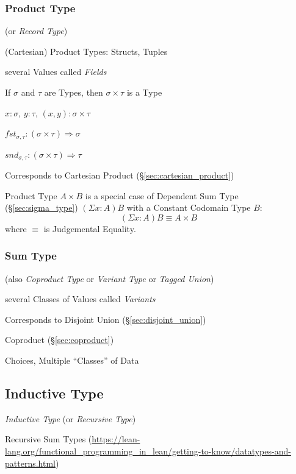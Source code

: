 \subsubsection{Product Type}\label{sec:product_type}

(or \emph{Record Type})

(Cartesian) Product Types: Structs, Tuples

several Values called \emph{Fields}

If $\sigma$ and $\tau$ are Types, then $\sigma \times \tau$ is a Type

$x : \sigma$, $y : \tau$, $(x,y) : \sigma \times \tau$

$fst_{\sigma,\tau} : (\sigma \times \tau) \Rightarrow \sigma$

$snd_{\sigma,\tau} : (\sigma \times \tau) \Rightarrow \tau$

Corresponds to Cartesian Product (\S\ref{sec:cartesian_product})

Product Type $A \times B$ is a special case of Dependent Sum Type
(\S\ref{sec:sigma_type}) $(\Sigma x:A)B$ with a Constant Codomain
Type $B$:
\[
  (\Sigma x:A) B \equiv A \times B
\]
where $\equiv$ is Judgemental Equality.



\subsubsection{Sum Type}\label{sec:sum_type}

(also \emph{Coproduct Type} or \emph{Variant Type} or \emph{Tagged
  Union})

several Classes of Values called \emph{Variants}

Corresponds to Disjoint Union (\S\ref{sec:disjoint_union})

Coproduct (\S\ref{sec:coproduct})

Choices, Multiple ``Classes'' of Data



\subsection{Inductive Type}\label{sec:inductive_type}

\emph{Inductive Type} (or \emph{Recursive Type})

Recursive Sum Types
(\url{https://lean-lang.org/functional_programming_in_lean/getting-to-know/datatypes-and-patterns.html})

